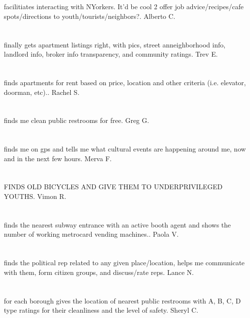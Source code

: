 \section{} facilitiates interacting with NYorkers. It'd be cool 2 offer job advice/recipes/cafe spots/directions to youth/tourists/neighbors?. Alberto C.
\section{}finally gets apartment listings right,  with pics,  street anneighborhood info,  landlord info,  broker info transparency,  and community ratings. Trev E.
\section{}finds apartments for rent based on price,  location and other criteria (i.e. elevator,  doorman,  etc).. Rachel S.
\section{} finds me clean public restrooms for free. Greg  G.
\section{}finds me on gps and tells me what cultural events are happening around me,  now and in the next few hours. Merva F.
\section{} FINDS OLD BICYCLES AND GIVE THEM TO UNDERPRIVILEGED YOUTHS. Vimon R.
\section{}finds the nearest subway entrance with an active booth agent and shows the number of working metrocard vending machines.. Paola V.
\section{}finds the political rep related to any given place/location,  helps me communicate with them,  form citizen groups,  and discuss/rate reps. Lance N.
\section{}for each borough gives the location of nearest public restrooms with A,  B,  C,  D type ratings for their cleanliness and the level of safety. Sheryl C.
